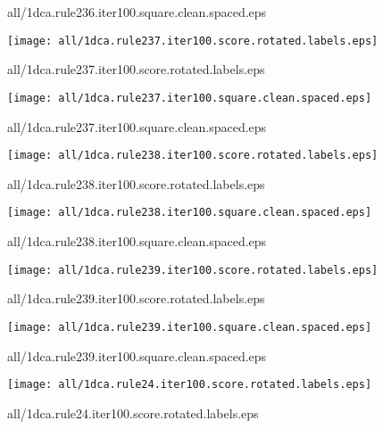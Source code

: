 \documentclass{article}
\begin{document}
{\footnotesize all/1dca.rule236.iter100.square.clean.spaced.eps}
\begin{center}
\begin{minipage}{\textwidth}
\texttt{[image: all/1dca.rule237.iter100.score.rotated.labels.eps]}
\end{minipage}
\end{center}
{\footnotesize all/1dca.rule237.iter100.score.rotated.labels.eps}
\begin{center}
\begin{minipage}{\textwidth}
\texttt{[image: all/1dca.rule237.iter100.square.clean.spaced.eps]}
\end{minipage}
\end{center}
{\footnotesize all/1dca.rule237.iter100.square.clean.spaced.eps}
\begin{center}
\begin{minipage}{\textwidth}
\texttt{[image: all/1dca.rule238.iter100.score.rotated.labels.eps]}
\end{minipage}
\end{center}
{\footnotesize all/1dca.rule238.iter100.score.rotated.labels.eps}
\begin{center}
\begin{minipage}{\textwidth}
\texttt{[image: all/1dca.rule238.iter100.square.clean.spaced.eps]}
\end{minipage}
\end{center}
{\footnotesize all/1dca.rule238.iter100.square.clean.spaced.eps}
\begin{center}
\begin{minipage}{\textwidth}
\texttt{[image: all/1dca.rule239.iter100.score.rotated.labels.eps]}
\end{minipage}
\end{center}
{\footnotesize all/1dca.rule239.iter100.score.rotated.labels.eps}
\begin{center}
\begin{minipage}{\textwidth}
\texttt{[image: all/1dca.rule239.iter100.square.clean.spaced.eps]}
\end{minipage}
\end{center}
{\footnotesize all/1dca.rule239.iter100.square.clean.spaced.eps}
\begin{center}
\begin{minipage}{\textwidth}
\texttt{[image: all/1dca.rule24.iter100.score.rotated.labels.eps]}
\end{minipage}
\end{center}
{\footnotesize all/1dca.rule24.iter100.score.rotated.labels.eps}
\end{document}
